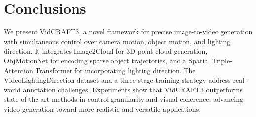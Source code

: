 
\section{Conclusions}
We present VidCRAFT3, a novel framework for precise image-to-video generation with simultaneous control over camera motion, object motion, and lighting direction. It integrates Image2Cloud for 3D point cloud generation, ObjMotionNet for encoding sparse object trajectories, and a Spatial Triple-Attention Transformer for incorporating lighting direction. The VideoLightingDirection dataset and a three-stage training strategy address real-world annotation challenges. Experiments show that VidCRAFT3 outperforms state-of-the-art methods in control granularity and visual coherence, advancing video generation toward more realistic and versatile applications.
